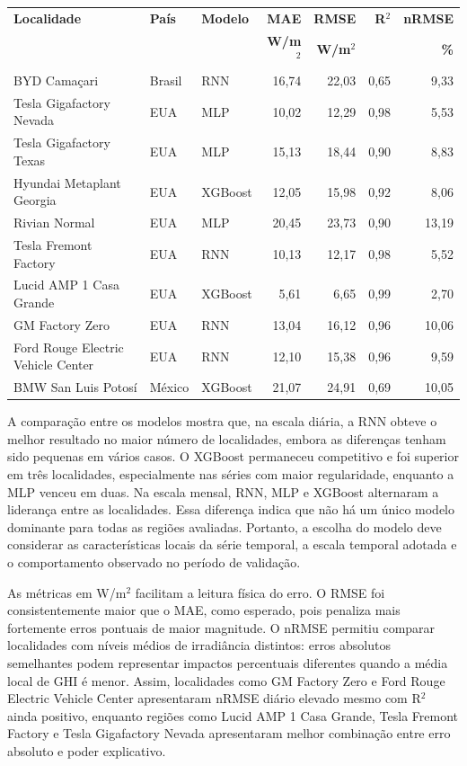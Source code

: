 \documentclass[12pt,a4paper]{article}
\begin{document}
\begin{center}
\small
\begin{tabular}{p{5.2cm}p{1.6cm}p{1.9cm}rrrr}
\toprule
\textbf{Localidade} & \textbf{País} & \textbf{Modelo} & \textbf{MAE} & \textbf{RMSE} & \textbf{R$^2$} & \textbf{nRMSE} \\
 & & & \textbf{W/m$^2$} & \textbf{W/m$^2$} & & \textbf{\%} \\
\midrule
BYD Camaçari & Brasil & RNN & 16,74 & 22,03 & 0,65 & 9,33 \\
Tesla Gigafactory Nevada & EUA & MLP & 10,02 & 12,29 & 0,98 & 5,53 \\
Tesla Gigafactory Texas & EUA & MLP & 15,13 & 18,44 & 0,90 & 8,83 \\
Hyundai Metaplant Georgia & EUA & XGBoost & 12,05 & 15,98 & 0,92 & 8,06 \\
Rivian Normal & EUA & MLP & 20,45 & 23,73 & 0,90 & 13,19 \\
Tesla Fremont Factory & EUA & RNN & 10,13 & 12,17 & 0,98 & 5,52 \\
Lucid AMP 1 Casa Grande & EUA & XGBoost & 5,61 & 6,65 & 0,99 & 2,70 \\
GM Factory Zero & EUA & RNN & 13,04 & 16,12 & 0,96 & 10,06 \\
Ford Rouge Electric Vehicle Center & EUA & RNN & 12,10 & 15,38 & 0,96 & 9,59 \\
BMW San Luis Potosí & México & XGBoost & 21,07 & 24,91 & 0,69 & 10,05 \\
\bottomrule
\end{tabular}
\end{center}

\vspace{6pt}

A comparação entre os modelos mostra que, na escala diária, a RNN obteve o melhor resultado no maior número de localidades, embora as diferenças tenham sido pequenas em vários casos. O XGBoost permaneceu competitivo e foi superior em três localidades, especialmente nas séries com maior regularidade, enquanto a MLP venceu em duas. Na escala mensal, RNN, MLP e XGBoost alternaram a liderança entre as localidades. Essa diferença indica que não há um único modelo dominante para todas as regiões avaliadas. Portanto, a escolha do modelo deve considerar as características locais da série temporal, a escala temporal adotada e o comportamento observado no período de validação.

As métricas em W/m$^2$ facilitam a leitura física do erro. O RMSE foi consistentemente maior que o MAE, como esperado, pois penaliza mais fortemente erros pontuais de maior magnitude. O nRMSE permitiu comparar localidades com níveis médios de irradiância distintos: erros absolutos semelhantes podem representar impactos percentuais diferentes quando a média local de GHI é menor. Assim, localidades como GM Factory Zero e Ford Rouge Electric Vehicle Center apresentaram nRMSE diário elevado mesmo com R$^2$ ainda positivo, enquanto regiões como Lucid AMP 1 Casa Grande, Tesla Fremont Factory e Tesla Gigafactory Nevada apresentaram melhor combinação entre erro absoluto e poder explicativo.
\end{document}
